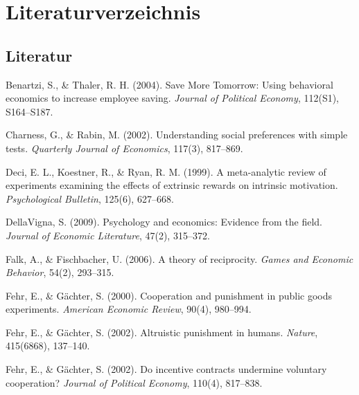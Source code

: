 \documentclass[11pt,a4paper]{article}
\begin{document}
\newpage


\section*{Literaturverzeichnis}

\subsection*{Literatur}

Benartzi, S., \& Thaler, R. H. (2004). Save More Tomorrow: Using behavioral economics to increase employee saving. \textit{Journal of Political Economy}, 112(S1), S164--S187.

\vspace{0.3cm}
Charness, G., \& Rabin, M. (2002). Understanding social preferences with simple tests. \textit{Quarterly Journal of Economics}, 117(3), 817--869.

\vspace{0.3cm}
Deci, E. L., Koestner, R., \& Ryan, R. M. (1999). A meta-analytic review of experiments examining the effects of extrinsic rewards on intrinsic motivation. \textit{Psychological Bulletin}, 125(6), 627--668.

\vspace{0.3cm}
DellaVigna, S. (2009). Psychology and economics: Evidence from the field. \textit{Journal of Economic Literature}, 47(2), 315--372.

\vspace{0.3cm}
Falk, A., \& Fischbacher, U. (2006). A theory of reciprocity. \textit{Games and Economic Behavior}, 54(2), 293--315.

\vspace{0.3cm}
Fehr, E., \& Gächter, S. (2000). Cooperation and punishment in public goods experiments. \textit{American Economic Review}, 90(4), 980--994.

\vspace{0.3cm}
Fehr, E., \& Gächter, S. (2002). Altruistic punishment in humans. \textit{Nature}, 415(6868), 137--140.

\vspace{0.3cm}
Fehr, E., \& Gächter, S. (2002). Do incentive contracts undermine voluntary cooperation? \textit{Journal of Political Economy}, 110(4), 817--838.
\end{document}
